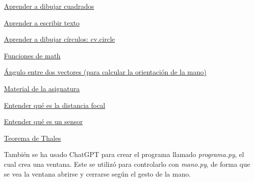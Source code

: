 \documentclass[12pt]{article}
\begin{document}
\href{https://docs.opencv.org/3.4/d6/d6e/group__imgproc__draw.html#ga07d2f74cadcf8e305e810ce8eed13bc9}{Aprender a dibujar cuadrados}

\href{https://docs.opencv.org/3.4/d6/d6e/group__imgproc__draw.html#ga5126f47f883d730f633d74f07456c576}{Aprender a escribir texto}

\href{https://docs.opencv.org/3.4/d6/d6e/group__imgproc__draw.html#gaf10604b069374903dbd0f0488cb43670}{Aprender a dibujar círculos: cv.circle}

\href{https://docs.python.org/3/library/math.html}{Funciones de math}

\href{https://www.superprof.es/apuntes/escolar/matematicas/analitica/vectores/angulo-de-dos-vectores.html}{Ángulo entre dos vectores (para calcular la orientación de la mano)}

\href{https://github.com/albertoruiz/umucv/blob/master/notebooks/imagen.ipynb}{Material de la asignatura}

\href{https://www.sony.es/electronics/support/articles/00267921}{Entender qué es la distancia focal}

\href{https://www.blogdelfotografo.com/tipos-caracteristicas-ventajas-sensores-camaras-fotos/}{Entender qué es un sensor}

\href{https://www.superprof.es/apuntes/escolar/matematicas/geometria/basica/triangulos-en-posicion-de-thales.html}{Teorema de Thales}

También se ha usado ChatGPT para crear el programa llamado \textit{programa.py}, el cual crea una ventana. Este se utilizó para controlarlo con \textit{mano.py}, de forma que se vea la ventana abrirse y cerrarse según el gesto de la mano.
\end{document}

